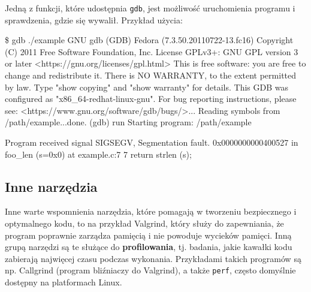 Jedną z funkcji, które udostępnia \texttt{gdb}, jest możliwość uruchomienia programu i sprawdzenia, gdzie się wywalił. Przykład użycia:

\begin{plain}
\$ gdb ./example
GNU gdb (GDB) Fedora (7.3.50.20110722-13.fc16)
Copyright (C) 2011 Free Software Foundation, Inc.
License GPLv3+: GNU GPL version 3 or later <https://gnu.org/licenses/gpl.html>
This is free software: you are free to change and redistribute it.
There is NO WARRANTY, to the extent permitted by law.  Type "show copying"
and "show warranty" for details.
This GDB was configured as "x86_64-redhat-linux-gnu".
For bug reporting instructions, please see:
<https://www.gnu.org/software/gdb/bugs/>...
Reading symbols from /path/example...done.
(gdb) run
Starting program: /path/example

Program received signal SIGSEGV, Segmentation fault.
0x0000000000400527 in foo_len (s=0x0) at example.c:7
7	  return strlen (s);
\end{plain}

\subsection{Inne narzędzia}

Inne warte wspomnienia narzędzia, które pomagają w tworzeniu bezpiecznego i optymalnego kodu, to na przykład Valgrind, który służy do zapewniania, że program poprawnie zarządza pamięcią i nie powoduje wycieków pamięci. Inną grupą narzędzi są te służące do \textbf{profilowania}, tj. badania, jakie kawałki kodu zabierają najwięcej czasu podczas wykonania. Przykładami takich programów są np. Callgrind (program bliźniaczy do Valgrind), a także \texttt{perf}, często domyślnie dostępny na platformach Linux. 



